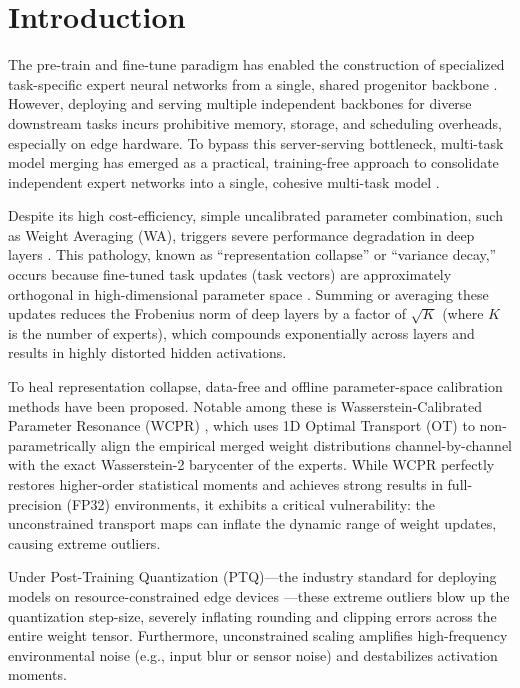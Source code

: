 \documentclass{article}
\theoremstyle{plain}
\theoremstyle{definition}
\theoremstyle{remark}
\begin{document}
\section{Introduction}
\label{sec:intro}
The pre-train and fine-tune paradigm has enabled the construction of specialized task-specific expert neural networks from a single, shared progenitor backbone \cite{Devlin2018BERT, He2016ResNet}. However, deploying and serving multiple independent backbones for diverse downstream tasks incurs prohibitive memory, storage, and scheduling overheads, especially on edge hardware. To bypass this server-serving bottleneck, multi-task model merging has emerged as a practical, training-free approach to consolidate independent expert networks into a single, cohesive multi-task model \cite{Wortsman2022Soups, Ilharco2023Arithmetic}.

Despite its high cost-efficiency, simple uncalibrated parameter combination, such as Weight Averaging (WA), triggers severe performance degradation in deep layers \cite{Jordan2023Repair}. This pathology, known as ``representation collapse'' or ``variance decay,'' occurs because fine-tuned task updates (task vectors) are approximately orthogonal in high-dimensional parameter space \cite{OrtizJimenez2023Geometry}. Summing or averaging these updates reduces the Frobenius norm of deep layers by a factor of $\sqrt{K}$ (where $K$ is the number of experts), which compounds exponentially across layers and results in highly distorted hidden activations.

To heal representation collapse, data-free and offline parameter-space calibration methods have been proposed. Notable among these is Wasserstein-Calibrated Parameter Resonance (WCPR) \cite{Leclaire2024IPR}, which uses 1D Optimal Transport (OT) to non-parametrically align the empirical merged weight distributions channel-by-channel with the exact Wasserstein-2 barycenter of the experts. While WCPR perfectly restores higher-order statistical moments and achieves strong results in full-precision (FP32) environments, it exhibits a critical vulnerability: the unconstrained transport maps can inflate the dynamic range of weight updates, causing extreme outliers.

Under Post-Training Quantization (PTQ)—the industry standard for deploying models on resource-constrained edge devices \cite{Dettmers2022LLM8bit, Frantar2023GPTQ, Xiao2023SmoothQuant}—these extreme outliers blow up the quantization step-size, severely inflating rounding and clipping errors across the entire weight tensor. Furthermore, unconstrained scaling amplifies high-frequency environmental noise (e.g., input blur or sensor noise) and destabilizes activation moments.
\end{document}
